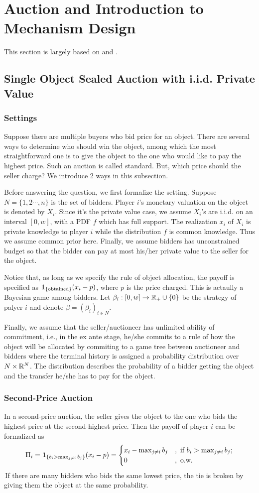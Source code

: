 \section{Auction and Introduction to Mechanism Design}
This section is largely based on \citet{Krishna2002-sr} and \citet{Borgers2015-xo}.
\subsection{Single Object Sealed Auction with i.i.d. Private Value}
\subsubsection{Settings}
Suppose there are multiple buyers who bid price for an object. There are several ways to determine who should win the object, among which the most straightforward one is to give the object to the one who would like to pay the highest price.
Such an auction is called standard.
But, which price should the seller charge? We introduce 2 ways in this subsection.

Before answering the question, we first formalize the setting. Suppose $N=\{1,2\cdots,n\}$ is the set of bidders. Player $i$'s monetary valuation on the object is denoted by $X_i$. 
Since it's the private value case, we assume $X_i$'s are i.i.d. on an interval $[0,w]$, with a PDF $f$ which has full support. The realization $x_i$ of $X_i$ is private knowledge to player $i$ while the distribution $f$ is common knowledge.
Thus we assume common prior here. Finally, we assume bidders has unconstrained budget so that the bidder can pay at most his/her private value to the seller for the object.

Notice that, as long as we specify the rule of object allocation, the payoff is specified as $\mathbf{1}_{\{\text{obtained}\}}(x_i-p)$, where $p$ is the price charged. This is actaully a Bayesian game among bidders. Let $\beta_i: [0,w]\to \mathbb{R}_+\cup \{0\}$ be the strategy of palyer $i$ and denote $\beta=(\beta_i)_{i\in N}$. 

Finally, we assume that the seller/auctioneer has unlimited ability of commitment, i.e., in the ex ante stage, he/she commits to a rule of how the object will be allocated by commiting to a game tree between auctioneer and bidders where the terminal history is assigned a probability distribution over $N\times \mathbb{R}^N$. 
The distribution describes the probability of a bidder getting the object and the transfer he/she has to pay for the object. 
\subsubsection{Second-Price Auction}
In a second-price auction, the seller gives the object to the one who bids the highest price at the second-highest price. Then the payoff of player $i$ can be formalized as 
$$\Pi_i = \mathbf{1}_{\{b_i>\max_{j\neq i}b_j\}}(x_i-p)=\begin{cases}
    x_i-\max_{j\neq i}b_j &,\text{ if } b_i>\max_{j\neq i}b_j;\\
    0 &,\text{ o.w.}
\end{cases}$$
\,If there are many bidders who bids the same lowest price, the tie is broken by giving them the object at the same probability.

